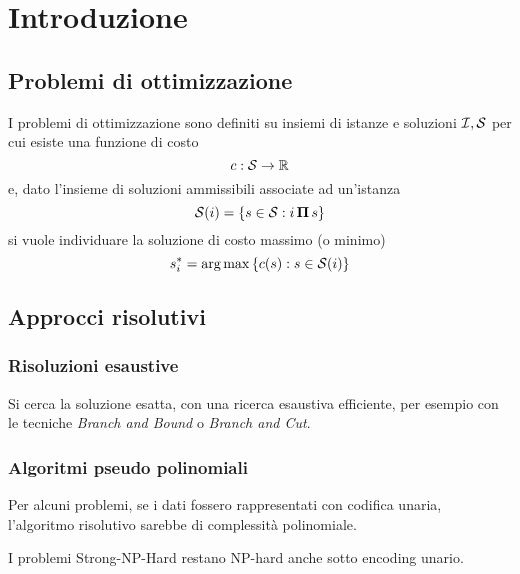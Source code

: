 \section{Introduzione}

\subsection{Problemi di ottimizzazione}

I problemi di ottimizzazione sono definiti su insiemi di istanze e soluzioni $
\mathcal{I}, \mathcal{S}
$ per cui esiste una funzione di costo
\begin{equation*}
    c : \mathcal{S}{} \to \mathbb{R}
\end{equation*}
e, dato l'insieme di soluzioni ammissibili associate ad un'istanza
\begin{equation*}
    \mathcal{S}{} (i) = \left\{ s \in \mathcal{S}{} : i \, \bm{\Pi}{} \, s \right\}
\end{equation*}
si vuole individuare la soluzione di costo massimo (o minimo)
\begin{equation*}
    s_{i}^{*} = \operatorname*{arg\,max} \left\{ c(s) : s \in \mathcal{S}{} (i) \right\}
\end{equation*}

\subsection{Approcci risolutivi}

\subsubsection{Risoluzioni esaustive}

Si cerca la soluzione esatta, con una ricerca esaustiva efficiente, per esempio con le tecniche \emph{Branch and Bound} o \emph{Branch and Cut}.

\subsubsection{Algoritmi pseudo polinomiali}

Per alcuni problemi, se i dati fossero rappresentati con codifica unaria, l'algoritmo risolutivo sarebbe di complessità polinomiale.

I problemi Strong-NP-Hard restano NP-hard anche sotto encoding unario.


